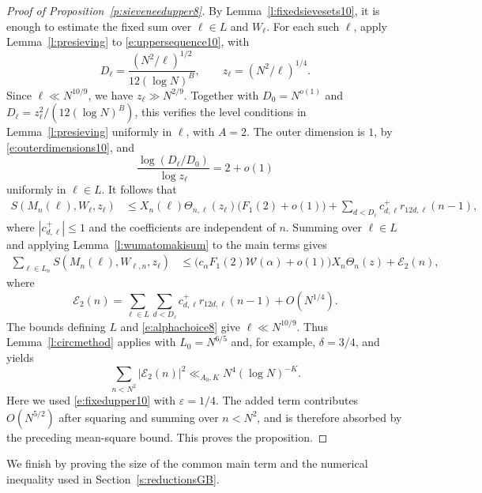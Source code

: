 \documentclass[12pt,reqno]{amsart}
\numberwithin{equation}{section}
\theoremstyle{definition}
\theoremstyle{remark}
\begin{document}
\begin{proof}[Proof of Proposition~\ref{p:sieveneedupper8}]
By Lemma~\ref{l:fixedsievesets10}, it is enough to estimate the fixed
sum over \(\ell\in L\) and \(W_\ell\).  For each such \(\ell\), apply
Lemma~\ref{l:presieving} to \eqref{e:uppersequence10}, with
\[
 D_\ell=\frac{(N^2/\ell)^{1/2}}
 {12(\log N)^B},
 \qquad z_\ell=(N^2/\ell)^{1/4}.
\]
Since \(\ell\ll N^{10/9}\), we have
\(z_\ell\gg N^{2/9}\). Together with \(D_0=N^{o(1)}\) and
\(D_\ell=z_\ell^2/(12(\log N)^B)\), this verifies the level
conditions in Lemma~\ref{l:presieving} uniformly in \(\ell\),
with \(A=2\). The outer dimension is \(1\), by \eqref{e:outerdimensions10}, and
\[
 \frac{\log(D_\ell/D_0)}{\log z_\ell}=2+o(1)
\]
uniformly in \(\ell\in L\).   It follows that
\begin{align*}
 S(M_n(\ell),W_\ell,z_\ell)
 &\leq X_n(\ell)\Theta_{n,\ell}(z_\ell)
 \bigl(F_1(2)+o(1)\bigr)+\sum_{d<D_\ell}c_{d,\ell}^+
 r_{12d,\ell}(n-1),
\end{align*}
where \(|c_{d,\ell}^+|\leq1\) and the coefficients are independent of
\(n\).  Summing over \(\ell\in L\) and applying
Lemma~\ref{l:wumatomakisum} to the main terms gives
\begin{align}\label{e:upperbound10}
 \sum_{\ell\in L_n}S(M_n(\ell),W_{\ell,n},z_\ell)
 &\leq
 \bigl(c_\alpha F_1(2)\mathcal W(\alpha)+o(1)\bigr)
 X_n\Theta_n(z)+\mathcal E_2(n),
\end{align}
where
\[
 \mathcal E_2(n)=
 \sum_{\ell\in L}\sum_{d<D_\ell}
 c_{d,\ell}^+r_{12d,\ell}(n-1)+O(N^{1/4}).
\]
The bounds defining \(L\) and \eqref{e:alphachoice8} give
\(\ell\ll N^{10/9}\).  Thus Lemma~\ref{l:circmethod} applies with
\(L_0=N^{6/5}\) and, for example, \(\delta=3/4\), and yields
\[
 \sum_{n<N^2}|\mathcal E_2(n)|^2
 \ll_{A_0,K}N^4(\log N)^{-K}.
\]
Here we used \eqref{e:fixedupper10} with \(\varepsilon=1/4\).  The
added term contributes \(O(N^{5/2})\) after squaring and summing over
\(n<N^2\), and is therefore absorbed by the preceding mean-square
bound.  This proves the proposition.
\end{proof}

We finish by proving the size of the common main term and the numerical
inequality used in Section~\ref{s:reductionsGB}.
\end{document}
